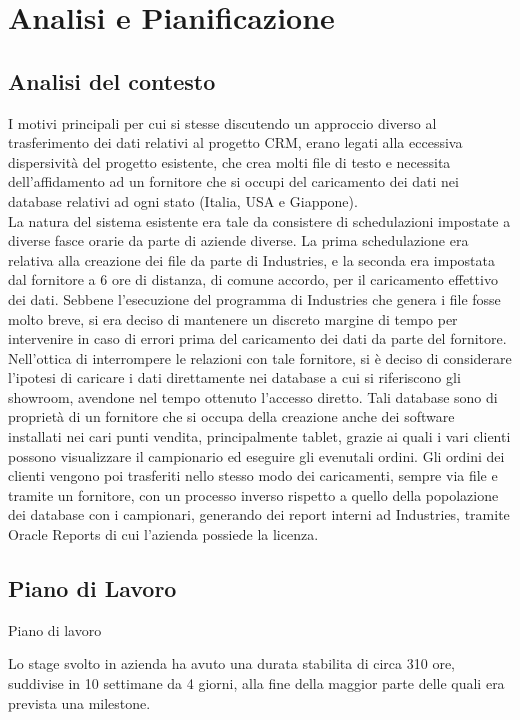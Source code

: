 \section{Analisi e Pianificazione}
\subsection{Analisi del contesto}
I motivi principali per cui si stesse discutendo un approccio diverso al trasferimento dei dati relativi al progetto CRM, erano legati alla eccessiva dispersività del progetto esistente, che crea molti file di testo e necessita dell'affidamento ad un fornitore che si occupi del caricamento dei dati nei database relativi ad ogni stato (Italia, USA e Giappone).\\
La natura del sistema esistente era tale da consistere di schedulazioni impostate a diverse fasce orarie da parte di aziende diverse. La prima schedulazione era relativa alla creazione dei file da parte di Industries, e la seconda era impostata dal fornitore a 6 ore di distanza, di comune accordo, per il caricamento effettivo dei dati. Sebbene l'esecuzione del programma di Industries che genera i file fosse molto breve, si era deciso di mantenere un discreto margine di tempo per intervenire in caso di errori prima del caricamento dei dati da parte del fornitore.\\
Nell'ottica di interrompere le relazioni con tale fornitore, si è deciso di considerare l'ipotesi di caricare i dati direttamente nei database a cui si riferiscono gli showroom, avendone nel tempo ottenuto l'accesso diretto. Tali database sono di proprietà di un fornitore che si occupa della creazione anche dei software installati nei cari punti vendita, principalmente tablet, grazie ai quali i vari clienti possono visualizzare il campionario ed eseguire gli evenutali ordini. Gli ordini dei clienti vengono poi trasferiti nello stesso modo dei caricamenti, sempre via file e tramite un fornitore, con un processo inverso rispetto a quello della popolazione dei database con i campionari, generando dei report interni ad Industries, tramite Oracle Reports di cui l'azienda possiede la licenza.

\subsection{Piano di Lavoro}
 Piano di lavoro

Lo stage svolto in azienda ha avuto una durata stabilita di circa 310 ore, suddivise in 10 settimane da 4 giorni, alla fine della maggior parte delle quali era prevista una milestone.\\
